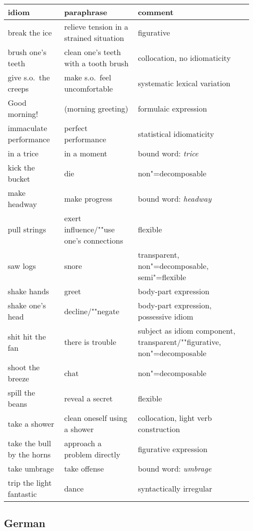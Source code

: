 \documentclass[output=paper
 	        ,biblatex
                ,babelshorthands
                ,newtxmath
                ,draftmode
                ,colorlinks, citecolor=brown
]{langscibook}
\begin{document}
\begin{tabular}{@{}lL{3.8cm}L{3.8cm}@{}}
idiom & paraphrase & comment\\\hline
break the ice      & relieve tension in a strained situation  & figurative\\
brush one's teeth  & clean one's teeth with a tooth brush     & collocation, no idiomaticity\\
give s.o.\ the creeps & make s.o.\ feel uncomfortable               & systematic lexical variation\\
Good morning!      & (morning greeting)                       & formulaic expression\\
immaculate performance & perfect performance & statistical idiomaticity\\
in a trice & in a moment & bound word: \emph{trice}\\
kick the bucket & die & non"=decomposable\\
make headway & make progress & bound word: \emph{headway}\\
pull strings & exert influence/""use one's connections & flexible\\
saw logs & snore & {transparent, non"=decomposable, semi"=flexible}\\
shake hands & greet & body-part expression\\
shake one's head & decline/""negate & {body-part expression, possessive idiom}\\
shit hit the fan & there is trouble & {subject as idiom component, transparent/""figurative, non"=decomposable}\\
shoot the breeze & chat & non"=decomposable\\
spill the beans & reveal a secret & flexible\\
take a shower & clean oneself using a shower & collocation, light verb construction\\
take the bull by the horns & {approach a problem directly} & figurative expression\\
take umbrage & take offense & bound word: \emph{umbrage}\\
trip the light fantastic & dance & syntactically irregular\\
\end{tabular}


\subsection*{German}
\end{document}
